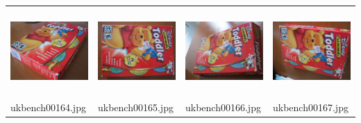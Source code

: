 \begin{tabular}{p{1.3in} p{1.3in} p{1.3in} p{1.3in} }
\includegraphics[keepaspectratio=false, height=1.3in, width=1.3in]{../datasets/ukbench-training/ukbench00164.jpg} & \includegraphics[keepaspectratio=false, height=1.3in, width=1.3in]{../datasets/ukbench-training/ukbench00165.jpg} & \includegraphics[keepaspectratio=false, height=1.3in, width=1.3in]{../datasets/ukbench-test/ukbench00166.jpg} & \includegraphics[keepaspectratio=false, height=1.3in, width=1.3in]{../datasets/ukbench-training/ukbench00167.jpg}\\
ukbench00164.jpg & ukbench00165.jpg & ukbench00166.jpg & ukbench00167.jpg\\
\end{tabular}

